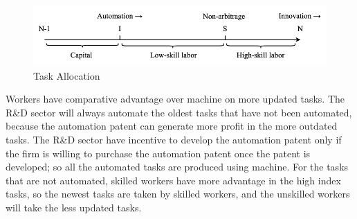 \documentclass[12pt]{article}
\begin{document}
\begin{figure}
\caption{Task Allocation}
\label{allocation}
\includegraphics[width=\textwidth]{allocation}
\end{figure}
Workers have comparative advantage over machine on more updated tasks. The R\&D sector will always automate the oldest tasks that have not been automated, because the automation patent can generate more profit in the more outdated tasks. The R\&D sector have incentive to develop the automation patent only if the firm is willing to purchase the automation patent once the patent is developed; so all the automated tasks are produced using machine. For the tasks that are not automated, skilled workers have more advantage in the high index tasks, so the newest tasks are taken by skilled workers, and the unskilled workers will take the less updated tasks. 
\end{document}

